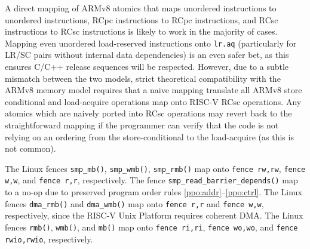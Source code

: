 A direct mapping of ARMv8 atomics that maps unordered instructions to unordered instructions, RCpc instructions to RCpc instructions, and RCsc instructions to RCsc instructions is likely to work in the majority of cases.
Mapping even unordered load-reserved instructions onto {\tt lr.aq} (particularly for LR/SC pairs without internal data dependencies) is an even safer bet, as this ensures C/C++ release sequences will be respected.
However, due to a subtle mismatch between the two models, strict theoretical compatibility with the ARMv8 memory model requires that a naive mapping translate all ARMv8 store conditional and load-acquire operations map onto RISC-V RCsc operations.
Any atomics which are naively ported into RCsc operations may revert back to the straightforward mapping if the programmer can verify that the code is not relying on an ordering from the store-conditional to the load-acquire (as this is not common).


The Linux fences {\tt smp\_mb()}, {\tt smp\_wmb()}, {\tt smp\_rmb()} map onto {\tt fence rw,rw}, {\tt fence w,w}, and {\tt fence r,r}, respectively.  The fence {\tt smp\_read\_barrier\_depends()} map to a no-op due to preserved program order rules \ref{ppo:addr}--\ref{ppo:ctrl}.
The Linux fences {\tt dma\_rmb()} and {\tt dma\_wmb()} map onto {\tt fence r,r} and {\tt fence w,w}, respectively, since the RISC-V Unix Platform requires coherent DMA.
The Linux fences {\tt rmb()}, {\tt wmb()}, and {\tt mb()} map onto {\tt fence ri,ri}, {\tt fence wo,wo}, and {\tt fence rwio,rwio}, respectively.

